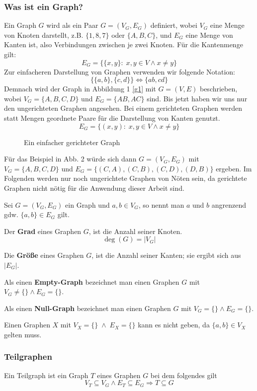 \subsubsection{Was ist ein Graph?}
Ein Graph $G$ wird als ein Paar $G=(V_G,E_G)$ definiert, wobei \(V_G\) eine Menge von Knoten darstellt, z.B. \(\{1, 8, 7\}\) oder \(\{A, B, C\}\), und \(E_G\) eine Menge von Kanten ist, also Verbindungen zwischen je zwei Knoten. Für die Kantenmenge gilt:
$$E_G = \{\{x, y\} \colon \; x,y \in V \wedge x \neq y \}$$
Zur einfacheren Darstellung von Graphen verwenden wir folgende Notation:
$$\{\{a, b\}, \{c, d\}\} \Leftrightarrow \{ab, cd\}$$
Demnach wird der Graph in Abbildung 1 \ref{g1} mit \(G=(V,E)\) beschrieben, wobei \(V_G=\{A,B,C,D\}\) und \(E_G=\{AB,AC\}\) sind. 
\newpage
Bis jetzt haben wir uns nur den ungerichteten Graphen angesehen. Bei einem gerichteten Graphen werden statt Mengen geordnete Paare für die Darstellung von Kanten genutzt. 
$$E_G = \{(x, y) \colon \; x,y \in V \wedge x \neq y \}$$
\begin{figure}[h]
    \centering
    
    \caption{Ein einfacher gerichteter Graph}
\end{figure}
Für das Beispiel in Abb. 2 würde sich dann $G=(V_G, E_G)$ mit $V_G=\{A,B,C,D\}$ und $E_G=\{(C,A), (C,B), (C,D), (D,B)\}$ ergeben. Im Folgenden werden nur noch ungerichtete Graphen von Nöten sein, da gerichtete Graphen nicht nötig für die Anwendung dieser Arbeit sind. 
\begin{definition}
    Sei $G=(V_G, E_G)$ ein Graph und $a, b \in V_G$, so nennt man $a$ und $b$ angrenzend gdw. $\{a,b\} \in E_G$ gilt.
\end{definition}
\begin{definition}
    Der \textbf{Grad} eines Graphen $G$, ist die Anzahl seiner Knoten. 
    $$\deg(G)=|V_G|$$
\end{definition}
\begin{definition}
    Die \textbf{Größe} eines Graphen $G$, ist die Anzahl seiner Kanten; sie ergibt sich aus $|E_G|$.
\end{definition}
\begin{definition}
    Als einen \textbf{Empty-Graph} bezeichnet man einen Graphen $G$ mit $V_G \neq \{\} \wedge E_G=\{\}$.\\
\end{definition}
\begin{definition}
     Als einen \textbf{Null-Graph} bezeichnet man einen Graphen $G$ mit $V_G=\{\} \wedge E_G=\{\}$.
\end{definition}
Einen Graphen $X$ mit $V_X = \{\} \; \wedge \; E_X =\{\}$ kann es nicht geben, da $\{a,b\} \in V_X$ gelten muss.
\newpage
\subsubsection{Teilgraphen}
Ein Teilgraph ist ein Graph $T$ eines Graphen $G$ bei dem folgendes gilt
$$V_T \subseteq V_G \wedge E_T \subseteq E_G \Rightarrow T \subseteq G$$